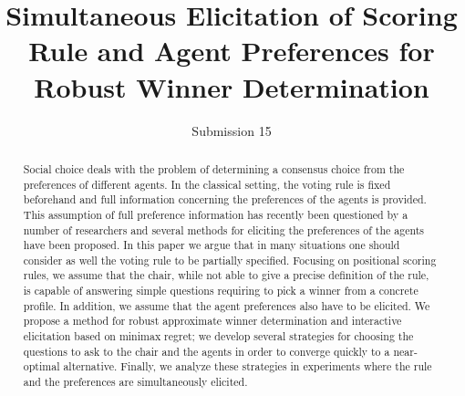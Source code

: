 \documentclass[runningheads]{llncs}
\theoremstyle{remark}
\begin{document}
%
\title{Simultaneous Elicitation of Scoring Rule and Agent Preferences for Robust Winner Determination}
%
%

\author{Submission 15}
\institute{}


\maketitle              %
\vspace{4em}
%
\begin{abstract}
\begin{sloppypar}
Social choice deals with the problem of determining a consensus choice from the preferences of different agents. In the classical setting, the voting rule is fixed beforehand and full information concerning the preferences of the agents is provided. This assumption of full preference information has recently been questioned by a number of researchers and several methods for eliciting the preferences of the agents have been proposed. In this paper we argue that in many situations one should consider as well the voting rule to be partially specified. Focusing on positional scoring rules, we assume that the chair, while not able to give a precise definition of the rule, is capable of answering simple questions requiring to pick a winner from a concrete profile. In addition, we assume that the agent preferences also have to be elicited. We propose a method for robust approximate winner determination and interactive elicitation based on minimax regret; we develop several strategies for choosing the questions to ask to the chair and the agents in order to converge quickly to a near-optimal alternative. Finally, we analyze these strategies in experiments where the rule and the preferences are simultaneously elicited.
\end{sloppypar}
\end{abstract}
%
%
%
\end{document}
